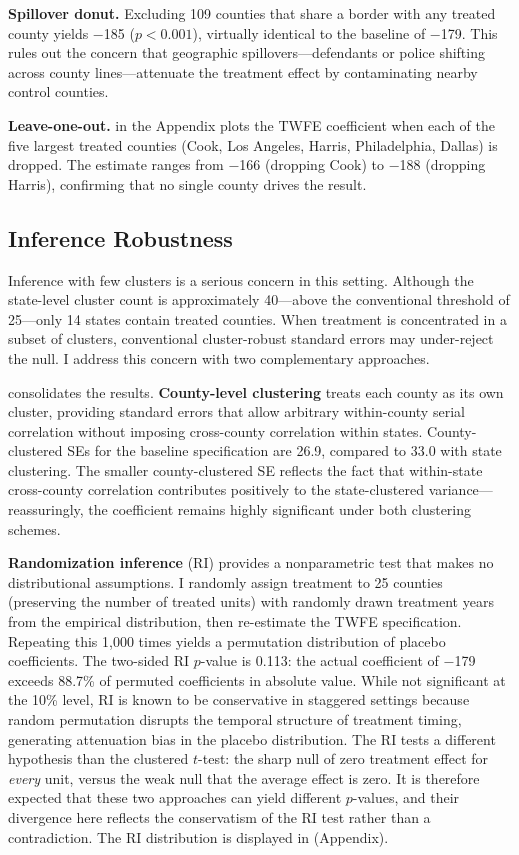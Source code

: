 \documentclass[12pt]{article}
\begin{document}
\textbf{Spillover donut.} Excluding 109 counties that share a border with any treated county yields $-$185 ($p < 0.001$), virtually identical to the baseline of $-$179. This rules out the concern that geographic spillovers---defendants or police shifting across county lines---attenuate the treatment effect by contaminating nearby control counties.

\textbf{Leave-one-out.}  in the Appendix plots the TWFE coefficient when each of the five largest treated counties (Cook, Los Angeles, Harris, Philadelphia, Dallas) is dropped. The estimate ranges from $-$166 (dropping Cook) to $-$188 (dropping Harris), confirming that no single county drives the result.



\subsection{Inference Robustness}

Inference with few clusters is a serious concern in this setting. Although the state-level cluster count is approximately 40---above the conventional threshold of 25---only 14 states contain treated counties. When treatment is concentrated in a subset of clusters, conventional cluster-robust standard errors may under-reject the null. I address this concern with two complementary approaches.

 consolidates the results. \textbf{County-level clustering} treats each county as its own cluster, providing standard errors that allow arbitrary within-county serial correlation without imposing cross-county correlation within states. County-clustered SEs for the baseline specification are 26.9, compared to 33.0 with state clustering. The smaller county-clustered SE reflects the fact that within-state cross-county correlation contributes positively to the state-clustered variance---reassuringly, the coefficient remains highly significant under both clustering schemes.

\textbf{Randomization inference} (RI) provides a nonparametric test that makes no distributional assumptions. I randomly assign treatment to 25 counties (preserving the number of treated units) with randomly drawn treatment years from the empirical distribution, then re-estimate the TWFE specification. Repeating this 1,000 times yields a permutation distribution of placebo coefficients. The two-sided RI $p$-value is 0.113: the actual coefficient of $-$179 exceeds 88.7\% of permuted coefficients in absolute value. While not significant at the 10\% level, RI is known to be conservative in staggered settings because random permutation disrupts the temporal structure of treatment timing, generating attenuation bias in the placebo distribution. The RI tests a different hypothesis than the clustered $t$-test: the sharp null of zero treatment effect for \textit{every} unit, versus the weak null that the average effect is zero. It is therefore expected that these two approaches can yield different $p$-values, and their divergence here reflects the conservatism of the RI test rather than a contradiction. The RI distribution is displayed in  (Appendix).
\end{document}
